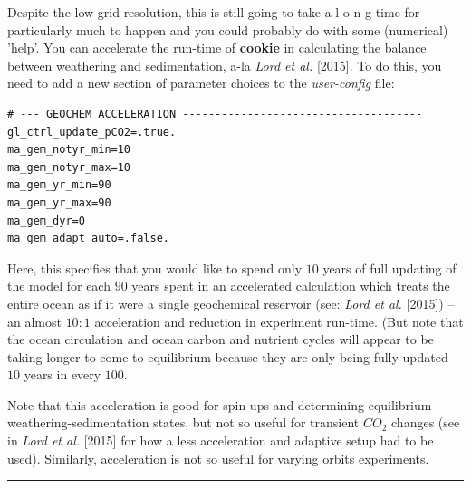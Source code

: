 \noindent Despite the low grid resolution, this is still  going to take a l o n g time for particularly much to happen and you could probably do with some (numerical) 'help'. You can accelerate the run-time of \textbf{cookie} in calculating the balance between weathering and sedimentation, a-la \textit{Lord et al.} [2015]. To do this, you need to add a new section of parameter choices to the \textit{user-config} file:
\vspace{-1mm}\small\begin{verbatim}
# --- GEOCHEM ACCELERATION -------------------------------------
gl_ctrl_update_pCO2=.true.
ma_gem_notyr_min=10
ma_gem_notyr_max=10
ma_gem_yr_min=90
ma_gem_yr_max=90
ma_gem_dyr=0
ma_gem_adapt_auto=.false.
\end{verbatim}\normalsize\vspace{-1mm}
Here, this specifies that you would like to spend only \(10\) years of full updating of the model for each \(90\) years spent in an accelerated calculation which treats the entire ocean as if it were a single geochemical reservoir (see: \textit{Lord et al.} [2015]) -- an almost \(10:1\) acceleration and reduction in experiment run-time. (But note that the ocean circulation and ocean carbon and nutrient cycles will appear to be taking longer to come to equilibrium because they are only being fully updated \(10\) years in every \(100\).

Note that this acceleration is good for spin-ups and determining equilibrium weathering-sedimentation states, but not so useful for transient \(CO_{2}\) changes (see in \textit{Lord et al.} [2015] for how a less acceleration and adaptive setup had to be used). Similarly, acceleration is not so useful for varying orbits experiments.

\vspace{1mm}\noindent\rule{4cm}{0.1mm}\vspace{2mm}


